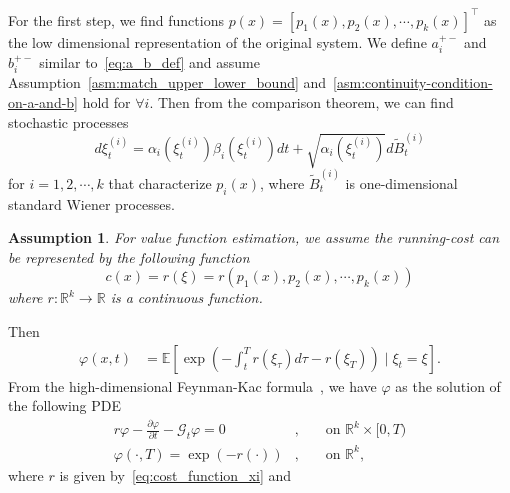 \documentclass[letterpaper]{article} %
\newcommand{\jacob}[1]{\textcolor{blue}{[Jacob: #1]}}
\newtheorem{assumption}[theorem]{Assumption}
\begin{document}
For the first step, we find functions $p(x) = [p_1(x), p_2(x), \cdots, p_k(x)]^\top$ as the low dimensional representation of the original system. 
We define $a_i^{+-}$ and $b_i^{+-}$ similar to~\eqref{eq:a_b_def} and assume Assumption~\ref{asm:match_upper_lower_bound} and~\ref{asm:continuity-condition-on-a-and-b} hold for $\forall i$.
Then from the comparison theorem, we can find stochastic processes
\begin{equation}
\label{eq:xi_process_high_dim}
    d \xi^{(i)}_t=\alpha_i\left(\xi^{(i)}_t\right) \beta_i\left(\xi^{(i)}_t\right) d t+\sqrt{\alpha_i\left(\xi^{(i)}_t\right)} d \tilde{B}^{(i)}_t
\end{equation}
for $i = 1,2,\cdots, k$ that characterize $p_i(x)$, where $\tilde{B}^{(i)}_t$ is one-dimensional standard Wiener processes.

\begin{assumption}
\label{asm:value_function_representation}
    For value function estimation, we assume the running-cost can be represented by the following function
\begin{equation}
\label{eq:cost_function_xi}
    c(x) = r(\xi) = r\left(p_1(x), p_2(x), \cdots, p_k(x)\right)
\end{equation}
where $r:\mathbb{R}^{k} \rightarrow \mathbb{R}$ is a continuous function.
\end{assumption}
Then 
\begin{equation}
\label{eq:xi_value_function_high_dim}
\begin{aligned}
    \varphi(x, t) %
    & = \mathbb{E} \left[\exp \left(-\int_t^T r(\xi_\tau) d \tau - r(\xi_T)\right)  \mid \xi_t=\xi\right].
\end{aligned}
\end{equation}
From the high-dimensional Feynman-Kac formula~\cite[Theorem 1.3.17]{pham2009continuous}, we have $\varphi$ as the solution of the following PDE
\begin{equation}
\begin{aligned}
r \varphi -\frac{\partial \varphi}{\partial t}-\mathcal{G}_t \varphi =0&, & & \text { on } \mathbb{R}^k \times [0, T) \\
\varphi(\cdot,T) =\exp(-r(\cdot))&, & & \text { on } \mathbb{R}^k,
\end{aligned}
\end{equation}
where $r$ is given by~\eqref{eq:cost_function_xi} and
\end{document}
